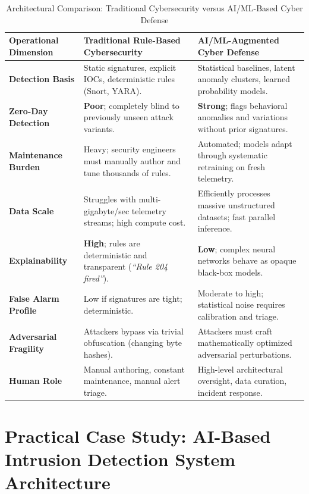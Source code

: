 \begin{table}[htbp]
\centering
\caption{Architectural Comparison: Traditional Cybersecurity versus AI/ML-Based Cyber Defense}
\label{tab:trad_vs_ai_cybersecurity}
\begin{tabularx}{\textwidth}{p{3.2cm} X X}
\toprule
\textbf{Operational Dimension} & \textbf{Traditional Rule-Based Cybersecurity} & \textbf{AI/ML-Augmented Cyber Defense} \\
\midrule
\textbf{Detection Basis} & Static signatures, explicit IOCs, deterministic rules (Snort, YARA). & Statistical baselines, latent anomaly clusters, learned probability models. \\
\textbf{Zero-Day Detection} & \textbf{Poor}; completely blind to previously unseen attack variants. & \textbf{Strong}; flags behavioral anomalies and variations without prior signatures. \\
\textbf{Maintenance Burden} & Heavy; security engineers must manually author and tune thousands of rules. & Automated; models adapt through systematic retraining on fresh telemetry. \\
\textbf{Data Scale} & Struggles with multi-gigabyte/sec telemetry streams; high compute cost. & Efficiently processes massive unstructured datasets; fast parallel inference. \\
\textbf{Explainability} & \textbf{High}; rules are deterministic and transparent (\textit{``Rule 204 fired''}). & \textbf{Low}; complex neural networks behave as opaque black-box models. \\
\textbf{False Alarm Profile} & Low if signatures are tight; deterministic. & Moderate to high; statistical noise requires calibration and triage. \\
\textbf{Adversarial Fragility} & Attackers bypass via trivial obfuscation (changing byte hashes). & Attackers must craft mathematically optimized adversarial perturbations. \\
\textbf{Human Role} & Manual authoring, constant maintenance, manual alert triage. & High-level architectural oversight, data curation, incident response. \\
\bottomrule
\end{tabularx}
\end{table}

\newpage
\section{Practical Case Study: AI-Based Intrusion Detection System Architecture}

